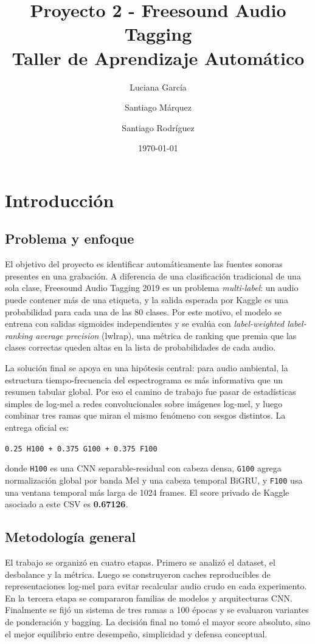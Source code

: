 \documentclass[10pt]{article}
\title{\textbf{Proyecto 2 - Freesound Audio Tagging}\\Taller de Aprendizaje Automático}
\author{Luciana García \and Santiago Márquez \and Santiago Rodríguez}
\date{\today}
\begin{document}
\maketitle

\section{Introducción}
\subsection{Problema y enfoque}
El objetivo del proyecto es identificar automáticamente las fuentes sonoras
presentes en una grabación. A diferencia de una clasificación tradicional de una
sola clase, Freesound Audio Tagging 2019 es un problema \textit{multi-label}: un
audio puede contener más de una etiqueta, y la salida esperada por Kaggle es una
probabilidad para cada una de las 80 clases. Por este motivo, el modelo se
entrena con salidas sigmoides independientes y se evalúa con \textit{label-weighted
label-ranking average precision} (lwlrap), una métrica de ranking que premia que
las clases correctas queden altas en la lista de probabilidades de cada audio.

La solución final se apoya en una hipótesis central: para audio ambiental, la
estructura tiempo-frecuencia del espectrograma es más informativa que un resumen
tabular global. Por eso el camino de trabajo fue pasar de estadísticas simples
de log-mel a redes convolucionales sobre imágenes log-mel, y luego combinar tres
ramas que miran el mismo fenómeno con sesgos distintos. La entrega oficial es:

\begin{center}
\texttt{0.25 H100 + 0.375 G100 + 0.375 F100}
\end{center}

donde \texttt{H100} es una CNN separable-residual con cabeza densa, \texttt{G100}
agrega normalización global por banda Mel y una cabeza temporal BiGRU, y
\texttt{F100} usa una ventana temporal más larga de 1024 frames. El score privado
de Kaggle asociado a este CSV es \textbf{0.67126}.

\subsection{Metodología general}
El trabajo se organizó en cuatro etapas. Primero se analizó el dataset, el
desbalance y la métrica. Luego se construyeron caches reproducibles de
representaciones log-mel para evitar recalcular audio crudo en cada
experimento. En la tercera etapa se compararon familias de modelos y
arquitecturas CNN. Finalmente se fijó un sistema de tres ramas a 100 épocas y se
evaluaron variantes de ponderación y bagging. La decisión final no tomó el mayor
score absoluto, sino el mejor equilibrio entre desempeño, simplicidad y defensa
conceptual.
\end{document}
